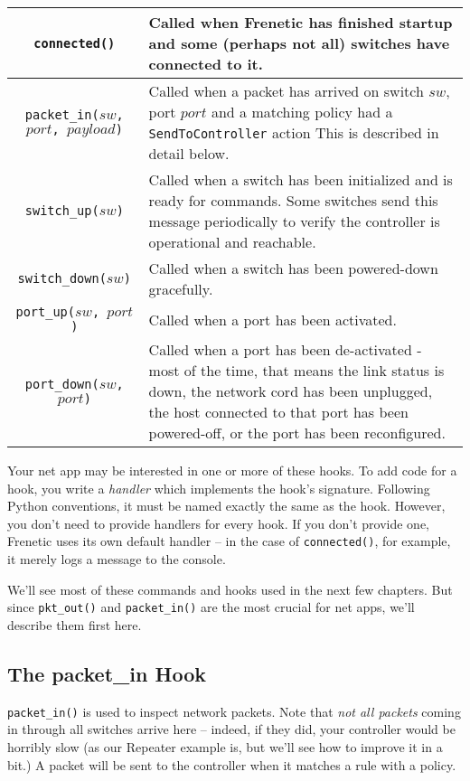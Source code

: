 \bigskip
\begin{tabularx}{\linewidth}{|c|X|}
\hline\hline
\texttt{connected()} & Called when Frenetic has finished startup and some (perhaps not all) 
switches have connected to it. 
\\ \hline
\texttt{packet\_in($sw$, $port$, $payload$)} & 
Called when 
a packet has arrived on switch $sw$, port $port$ and a matching policy had a \texttt{SendToController} action
 This is described in detail below.
\\ \hline  
\texttt{switch\_up($sw$)} & Called when a switch has been initialized and is ready for commands.  
Some switches send this message periodically to verify the controller is operational and reachable.
\\ \hline  
\texttt{switch\_down($sw$)} & Called when a switch has been powered-down gracefully.
\\ \hline  
\texttt{port\_up($sw$, $port$)} & Called when a port has been activated.
\\ \hline  
\texttt{port\_down($sw$, $port$)} & Called when a port has been de-activated - most of the time, that means the link
status is down, the network cord has been unplugged, the host connected to that port has been powered-off,
or the port has been reconfigured.
\\ \hline\hline
\end{tabularx}

\bigskip
Your net app may be interested in one or more of these hooks.
To add code for a hook, you write a \emph{handler} which implements the hook's signature.
Following Python conventions, it must be named exactly the same as the hook.
However, you don't need to provide handlers for every hook.
If you don't provide one, Frenetic uses its own default handler -- in the case of \texttt{connected()}, for example, it
merely logs a message to the console.  

We'll see most of these commands and hooks used in the next few chapters.  
But since \texttt{pkt\_out()} and \texttt{packet\_in()} are the most
crucial for net apps, we'll describe them first here.

\subsection{The packet\_in Hook}
\label{introduction:packet_in}

\texttt{packet\_in()} is used to inspect network packets.  
Note that \emph{not all packets} coming in through all switches 
arrive here -- indeed, if they did, your controller would be
horribly slow (as our Repeater example is, but we'll see how to improve it in a bit.)
A packet will be sent to the controller when it matches a rule with a  policy.  

